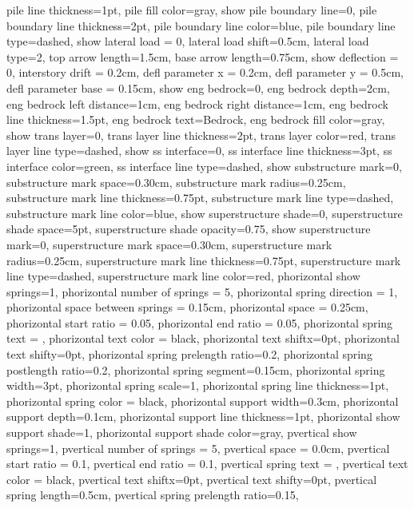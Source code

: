 {{  pile line thickness=1pt,
  pile fill color=gray,
  show pile boundary line=0,
  pile boundary line thickness=2pt,
  pile boundary line color=blue,
  pile boundary line type=dashed,
  show lateral load = 0,
  lateral load shift=0.5cm,
  lateral load type=2,
  top arrow length=1.5cm,
  base arrow length=0.75cm,
  show deflection = 0, 
  interstory drift = 0.2cm,
  defl parameter x = 0.2cm,
  defl parameter y = 0.5cm,
  defl parameter base = 0.15cm,
  show eng bedrock=0,
  eng bedrock depth=2cm,
  eng bedrock left distance=1cm,
  eng bedrock right distance=1cm,
  eng bedrock line thickness=1.5pt,
  eng bedrock text=Bedrock,
  eng bedrock fill color=gray,
  show trans layer=0,
  trans layer line thickness=2pt,
  trans layer color=red,
  trans layer line type=dashed,
  show ss interface=0,
  ss interface line thickness=3pt,
  ss interface color=green,
  ss interface line type=dashed,
  show substructure mark=0,
  substructure mark space=0.30cm,
  substructure mark radius=0.25cm,
  substructure mark line thickness=0.75pt,
  substructure mark line type=dashed,
  substructure mark line color=blue,
  show superstructure shade=0,
  superstructure shade space=5pt,
  superstructure shade opacity=0.75,
  show superstructure mark=0,
  superstructure mark space=0.30cm,
  superstructure mark radius=0.25cm,
  superstructure mark line thickness=0.75pt,
  superstructure mark line type=dashed,
  superstructure mark line color=red,
  phorizontal show springs=1,
  phorizontal number of springs = 5,
  phorizontal spring direction = 1,
  phorizontal space between springs = 0.15cm,
  phorizontal space = 0.25cm,
  phorizontal start ratio = 0.05,
  phorizontal end ratio = 0.05,
  phorizontal spring text = {},
  phorizontal text color = black,
  phorizontal text shiftx=0pt,
  phorizontal text shifty=0pt,
  phorizontal spring prelength ratio=0.2,
  phorizontal spring postlength ratio=0.2,
  phorizontal spring segment=0.15cm,
  phorizontal spring width=3pt,
  phorizontal spring scale=1,
  phorizontal spring line thickness=1pt,
  phorizontal spring color = black,
  phorizontal support width=0.3cm,
  phorizontal support depth=0.1cm,
  phorizontal support line thickness=1pt,
  phorizontal show support shade=1,
  phorizontal support shade color=gray,
  pvertical show springs=1,
  pvertical number of springs = 5,
  pvertical space = 0.0cm,
  pvertical start ratio = 0.1,
  pvertical end ratio = 0.1,
  pvertical spring text = {},
  pvertical text color = black,
  pvertical text shiftx=0pt,
  pvertical text shifty=0pt,
  pvertical spring length=0.5cm,
  pvertical spring prelength ratio=0.15,
}}

